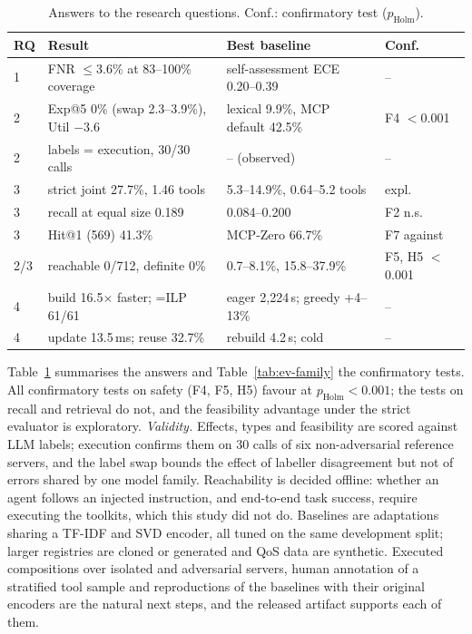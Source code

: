 \begin{table}[t]
\centering
\caption{Answers to the research questions. Conf.: confirmatory test ($p_{\mathrm{Holm}}$).}
\label{tab:ev-answers}
\scriptsize
\setlength{\tabcolsep}{2pt}
\begin{tabular}{@{}lp{3.0cm}p{3.15cm}l@{}}
\toprule
RQ & Result & Best baseline & Conf. \\
\midrule
1 & FNR $\le$3.6\% at 83--100\% coverage & self-assessment ECE 0.20--0.39 & -- \\
2 & Exp@5 0\% (swap 2.3--3.9\%), Util $-3.6$ & lexical 9.9\%, MCP default 42.5\% & F4 $<$0.001 \\
2 & labels = execution, 30/30 calls & -- (observed) & -- \\
3 & strict joint 27.7\%, 1.46 tools & 5.3--14.9\%, 0.64--5.2 tools & expl. \\
3 & recall at equal size 0.189 & 0.084--0.200 & F2 n.s. \\
3 & Hit@1 (569) 41.3\% & MCP-Zero 66.7\% & F7 against \\
2/3 & reachable 0/712, definite 0\% & 0.7--8.1\%, 15.8--37.9\% & F5, H5 $<$0.001 \\
4 & build 16.5$\times$ faster; =ILP 61/61 & eager 2,224\,s; greedy +4--13\% & -- \\
4 & update 13.5\,ms; reuse 32.7\% & rebuild 4.2\,s; cold & -- \\
\bottomrule
\end{tabular}
\end{table}



Table~\ref{tab:ev-answers} summarises the answers and Table~\ref{tab:ev-family} the confirmatory tests. All
confirmatory tests on safety (F4, F5, H5) favour \pamcp{} at $p_{\mathrm{Holm}}<0.001$; the tests on recall and
retrieval do not, and the feasibility advantage under the strict evaluator is exploratory. \emph{Validity.} Effects, types and feasibility are scored against LLM labels;
execution confirms them on 30 calls of six non-adversarial reference servers, and the label swap bounds the effect
of labeller disagreement but not of errors shared by one model family. Reachability is decided offline: whether an
agent follows an injected instruction, and end-to-end task success, require executing the toolkits, which this
study did not do. Baselines are adaptations sharing a TF-IDF and SVD encoder, all tuned on the same development
split; larger registries are cloned or generated and QoS data are synthetic. Executed compositions over isolated
and adversarial servers, human annotation of a stratified tool sample and reproductions of the baselines with their
original encoders are the natural next steps, and the released artifact supports each of them.
